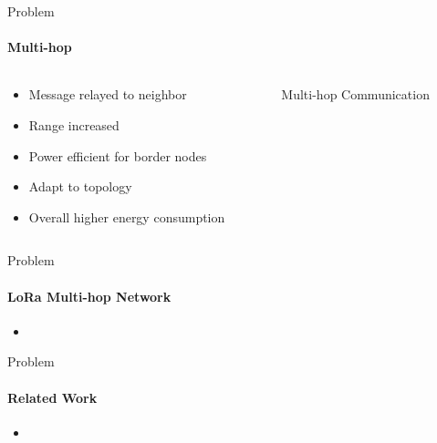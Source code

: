 \begin{frame}{Problem}
\framesubtitle{Multi-hop}
\begin{columns}
\begin{column}{0.6\textwidth}
\begin{itemize}
    \item Message relayed to neighbor
    \item Range increased
    \item Power efficient for border nodes
    \item Adapt to topology
    \item Overall higher energy consumption
\end{itemize}
\end{column}
\begin{column}{0.4\textwidth}
\begin{figure}[H]
    \centering
    \caption{Multi-hop Communication\label{fig:multihop}}
\end{figure}

\end{column}
\end{columns}

\end{frame}

\begin{frame}{Problem}
\framesubtitle{LoRa Multi-hop Network}
\begin{itemize}
    \item 
\end{itemize}
\end{frame}

\begin{frame}{Problem}
\framesubtitle{Related Work}
\begin{itemize}
    \item 
\end{itemize}
\end{frame}

